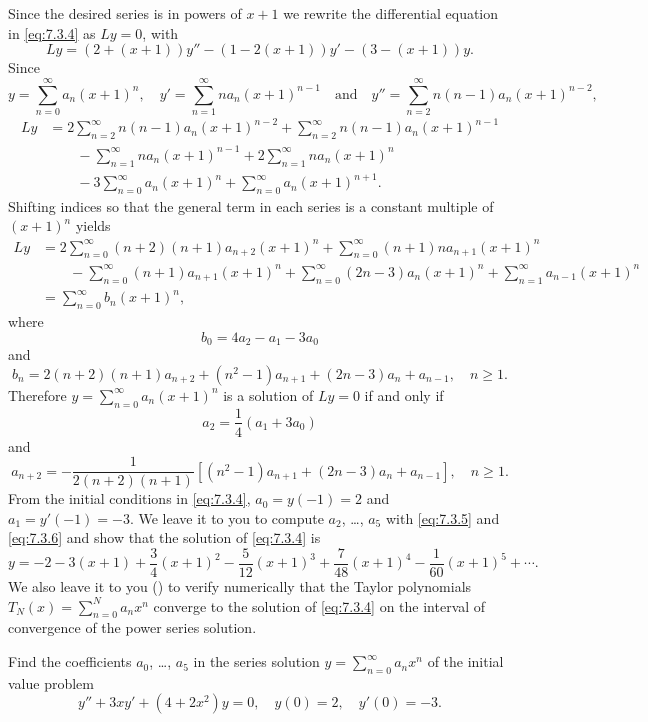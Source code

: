 \begin{solution}
Since the desired series is in powers of $x+1$ we rewrite
the differential equation in \eqref{eq:7.3.4} as $Ly=0$, with
\[
Ly=\left(2+(x+1)\right)y''-\left(1-2(x+1)\right)y'-\left(3-(x+1)\right)y.
\]
Since
\[
y=\sum^\infty_{n=0} a_n(x+1)^n,\quad y'=\sum^\infty_{n=1} n
a_n(x+1)^{n-1}\quad\text{and}\quad
y''=\sum^\infty_{n=2}n(n-1)a_n(x+1)^{n-2},
\]
\begin{align*}
Ly&=2\sum^\infty_{n=2}n(n-1)a_n(x+1)^{n-2}+\sum^\infty_{n=2}n(n-1)a_n(x+1)^{n-1}\\
&\qquad{}-\sum^\infty_{n=1}na_n(x+1)^{n-1}+2\sum^\infty_{n=1}na_n(x+1)^n\\
&\qquad{}-3\sum^\infty_{n=0}a_n(x+1)^n+\sum_{n=0}^\infty a_n(x+1)^{n+1}.
\end{align*}
Shifting indices so that  the general term in each
series is a constant multiple of $(x+1)^n$ yields
\begin{align*}
Ly&=2\sum^\infty_{n=0}(n+2)(n+1)a_{n+2}(x+1)^n+\sum^\infty_{n=0}(n+1)na_{n+1}
(x+1)^n\\
&\qquad{}-\sum^\infty_{n=0}(n+1)a_{n+1}(x+1)^n
+\sum^\infty_{n=0}(2n-3)a_n(x+1)^n+\sum^\infty_{n=1}a_{n-1}(x+1)^n\\[10pt]
&=\sum^\infty_{n=0}b_n(x+1)^n,
\end{align*}
where
\[
b_0=4a_2-a_1-3a_0
\]
and
\[
b_n=2(n+2)(n+1)a_{n+2}+(n^2-1)a_{n+1}+(2n-3)a_n+a_{n-1},\quad n\ge1.
\]
Therefore $y=\sum^\infty_{n=0}a_n(x+1)^n$ is a solution of $Ly=0$
if and only if
\begin{equation} \label{eq:7.3.5}
a_2=\frac{1}{4}(a_1+3a_0)
\end{equation}
and
\begin{equation} \label{eq:7.3.6}
a_{n+2}=-\frac{1}{2(n+2)(n+1)}\left[(n^2-1)a_{n+1}+(2n-3)a_n+a_{n-1}\right],
\quad n\ge1.
\end{equation}
From the initial conditions in \eqref{eq:7.3.4}, $a_0=y(-1)=2$ and
$a_1=y'(-1)=-3$. We leave it to you to  compute $a_2$, \dots, $a_5$
with  \eqref{eq:7.3.5} and \eqref{eq:7.3.6} and show that
the solution of \eqref{eq:7.3.4} is
\[
y=-2-3(x+1)+\frac{3}{4}(x+1)^2-\frac{5}{12}(x+1)^3+\frac{7}{48}(x+1)^4
-\frac{1}{60}(x+1)^5+\cdots.
\]
We also leave it to you () to verify numerically
that the Taylor polynomials $T_N(x)=\sum_{n=0}^Na_nx^n$ converge to
the solution of \eqref{eq:7.3.4}  on the interval of
convergence of the power series solution.
\end{solution}

\begin{example}\label{example:7.3.3}
Find the coefficients $a_0$, \dots, $a_5$ in the series
solution $y=\sum^\infty_{n=0}
a_nx^n$   of the initial value problem
\begin{equation} \label{eq:7.3.7}
y''+3xy'+(4+2x^2)y=0,\quad y(0)=2,\quad y'(0)=-3.
\end{equation}
\end{example}

